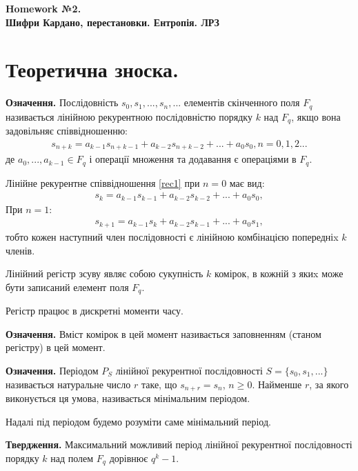 \documentclass{../../test-template}
\begin{document}
\begin{center}
    \textbf{\Huge{Homework №2.} \\ \large Шифри Кардано, перестановки. Ентропія. ЛРЗ}
\end{center}

\section*{Теоретична зноска.}

\begin{tcolorbox}[breakable, colback=gray!10!white,fonttitle=\bfseries,colframe=purple!80!black,title=ЛРЗ]
\par \textbf{Означення.} Послідовність $s_0, s_1, ..., s_n, ...$ елементів скінченного поля $F_q$ називається лінійною рекурентною послідовністю порядку $k$ над $F_q$, якщо вона задовільняє співвідношенню:
\begin{align}\label{rec1}
    s_{n+k} = a_{k-1}s_{n+k-1}+a_{k-2}s_{n+k-2}+...+a_0s_0,  n=0,1,2...
\end{align}
де $a_0,...,a_{k-1} \in F_q$ і операції множення та додавання є операціями в $F_q$. 

Лінійне рекурентне співвідношення \ref{rec1} при $n=0$ має вид:
\begin{align*}
    s_{k} = a_{k-1}s_{k-1}+a_{k-2}s_{k-2}+...+a_0s_0,
\end{align*}
При $n=1$:
\begin{align*}
    s_{k+1} = a_{k-1}s_{k}+a_{k-2}s_{k-1}+...+a_0s_1,
\end{align*}
тобто кожен наступний член послідовності є лінійною комбінацією попередніx $k$ членів.

Лінійний регістр зсуву являє собою сукупність $k$ комірок, в кожній з якиx може бути записаний елемент поля $F_q$.

Регістр працює в дискретні моменти часу.

\textbf{Означення.} Вміст комірок в цей момент називається заповненням (станом регістру) в цей момент.

\textbf{Означення.} Періодом $P_S$ лінійної рекурентної послідовності $S=\{s_0, s_1, ...\}$ називається натуральне число $r$ таке, що $s_{n+r} = s_n$, $n \geq 0$. Найменше $r$, за якого виконується ця умова, називається мінімальним періодом.

Надалі під періодом будемо розуміти саме мінімальний період.

\textbf{Твердження.} Максимальний можливий період лінійної рекурентної послідовності порядку $k$ над полем $F_q$ дорівнює $q^k - 1$.


\end{tcolorbox}
\end{document}

